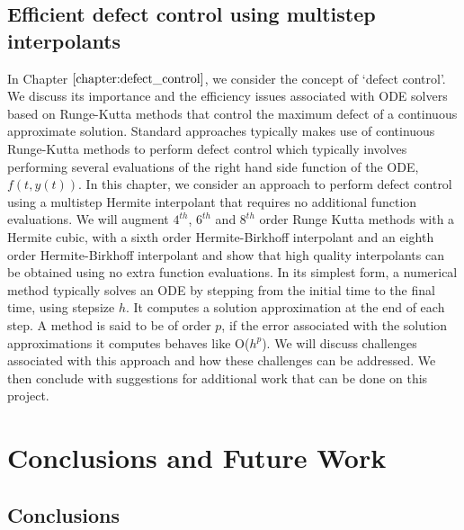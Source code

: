 \documentclass{report}
\begin{document}
\section{Efficient defect control using multistep interpolants}
In Chapter $\ref{chapter:defect_control}$, we consider the concept of `defect control'. We discuss its importance and the efficiency issues associated with ODE solvers based on Runge-Kutta methods \cite{MR3822086} that control the maximum defect of a continuous approximate solution. Standard approaches typically makes use of continuous Runge-Kutta methods \cite{MR3822086} to perform defect control which typically involves performing several evaluations of the right hand side function of the ODE, $f(t, y(t))$. In this chapter, we consider an approach to perform defect control using a multistep Hermite interpolant \cite{MR3822086} that requires no additional function evaluations. We will augment $4^{th}$, $6^{th}$ and $8^{th}$ order Runge Kutta methods with a Hermite cubic, with a sixth order Hermite-Birkhoff interpolant and an eighth order Hermite-Birkhoff interpolant and show that high quality interpolants can be obtained using no extra function evaluations. In its simplest form, a numerical method typically solves an ODE by stepping from the initial time to the final time, using stepsize $h$. It computes a solution approximation at the end of each step. A method is said to be of order $p$, if the error associated with the solution approximations it computes behaves like O($h^p$). We will discuss challenges associated with this approach and how these challenges can be addressed. We then conclude with suggestions for additional work that can be done on this project.













\chapter{Conclusions and Future Work}
\section{Conclusions}
\end{document}
